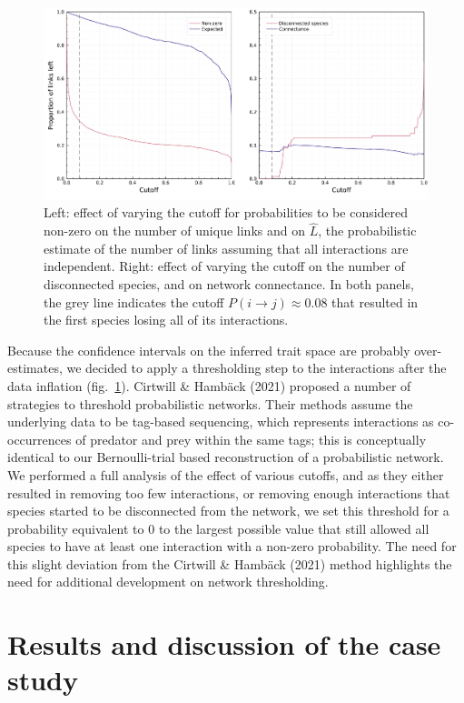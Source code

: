 \documentclass[11pt]{article}
\makeatletter
\def\maxwidth{\ifdim\Gin@nat@width>\linewidth\linewidth
\else\Gin@nat@width\fi}
\let\Oldincludegraphics\includegraphics
\renewcommand{\includegraphics}[1]{\Oldincludegraphics[width=\maxwidth]{#1}}
\makeatother
\begin{document}
\begin{figure}
\hypertarget{fig:thresholds}{%
\centering
\includegraphics{figures/figure-cutoffs.png}
\caption{Left: effect of varying the cutoff for probabilities to be
considered non-zero on the number of unique links and on \(\hat{L}\),
the probabilistic estimate of the number of links assuming that all
interactions are independent. Right: effect of varying the cutoff on the
number of disconnected species, and on network connectance. In both
panels, the grey line indicates the cutoff
\(P(i\rightarrow j) \approx 0.08\) that resulted in the first species
losing all of its interactions.}\label{fig:thresholds}
}

\end{figure}

Because the confidence intervals on the inferred trait space are
probably over-estimates, we decided to apply a thresholding step to the
interactions after the data inflation (fig.~\ref{fig:thresholds}).
Cirtwill \& Hambäck (2021) proposed a number of strategies to threshold
probabilistic networks. Their methods assume the underlying data to be
tag-based sequencing, which represents interactions as co-occurrences of
predator and prey within the same tags; this is conceptually identical
to our Bernoulli-trial based reconstruction of a probabilistic network.
We performed a full analysis of the effect of various cutoffs, and as
they either resulted in removing too few interactions, or removing
enough interactions that species started to be disconnected from the
network, we set this threshold for a probability equivalent to 0 to the
largest possible value that still allowed all species to have at least
one interaction with a non-zero probability. The need for this slight
deviation from the Cirtwill \& Hambäck (2021) method highlights the need
for additional development on network thresholding.

\hypertarget{results-and-discussion-of-the-case-study}{%
\section{Results and discussion of the case
study}\label{results-and-discussion-of-the-case-study}}
\end{document}

